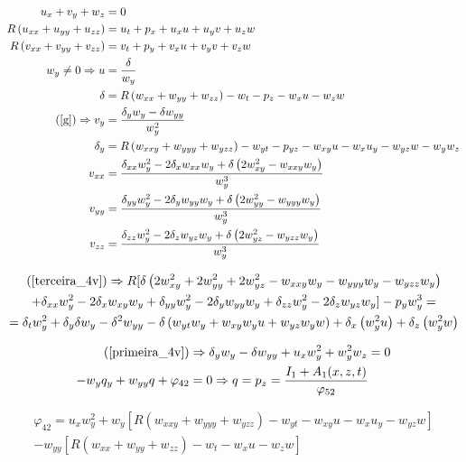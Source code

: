 \documentclass[12pt,a4paper]{article}
\begin{document}
	\begin{align}
	  u_x + v_y + w_z &= 0 \label{primeira_4v} \\
	  R \left(u_{xx} + u_{yy} + u_{zz} \right) &= u_t + p_x + u_x u + u_y v + u_z w \label{segunda_4v} \\
	  R \left(v_{xx} + v_{yy} + v_{zz} \right) &= v_t + p_y + v_x u + v_y v + v_z w \label{terceira_4v} \\
	  w_y \neq 0 \Rightarrow u &= \frac{\delta}{w_y} \\
	  \delta &= R \left(w_{xx} + w_{yy} + w_{zz} \right) - w_t - p_z - w_x u - w_z w \\
	  (\ref{g}) \Rightarrow v_y &= \frac{\delta_y w_y - \delta w_{yy}}{w_y^2} \\
	  \delta_y &= R \left(w_{xxy} + w_{yyy} + w_{yzz} \right) - w_{yt} - p_{yz} - w_{xy} u - w_x u_y - w_{yz} w - w_y w_z \\
	  v_{xx} &= \frac{\delta_{xx} w_y^2 - 2\delta_x w_{xx} w_y + \delta \left( 2w_{xy}^2 - w_{xxy} w_y \right)}{w_y^3} \\
	  v_{yy} &= \frac{\delta_{yy} w_y^2 - 2\delta_y w_{yy} w_y + \delta \left( 2w_{yy}^2 - w_{yyy} w_y \right)}{w_y^3} \\
	  v_{zz} &= \frac{\delta_{zz} w_y^2 - 2\delta_z w_{yz} w_y + \delta \left( 2w_{yz}^2 - w_{yzz} w_y \right)}{w_y^3}
	\end{align}

	\begin{multline}
    (\ref{terceira_4v}) \Rightarrow R [\delta \left( 2 w_{xy}^2 + 2 w_{yy}^2 + 2 w_{yz}^2 - w_{xxy}w_y - w_{yyy} w_y - w_{yzz} w_y \right) \\
    + \delta_{xx} w_y^2 - 2\delta_x w_{xy} w_y + \delta_{yy} w_y^2 - 2\delta_y w_{yy} w_y + \delta_{zz} w_y^2 - 2\delta_z w_{yz} w_y ] - p_y w_y^3 = \\
    = \delta_t w_y^2 + \delta_y \delta w_y - \delta^2 w_{yy} - \delta \left(w_{yt} w_y + w_{xy} w_y u + w_{yz} w_y w \right) + \delta_x \left(w_y^2 u \right) + \delta_z \left(w_y^2 w \right)
	\end{multline}

	\begin{align}
    (\ref{primeira_4v}) &\Rightarrow \delta_y w_y - \delta w_{yy} + u_x w_y^2 + w_y^2 w_z = 0 \\
    -w_y q_y + w_{yy} q + \varphi_{42} &= 0 \Rightarrow q = p_z = \frac{I_1 + A_1(x,z,t)}{\varphi_{52}}
	\end{align}

	\begin{multline}
    \varphi_{42} = u_x w_y^2 + w_y [ R \left(w_{xxy} + w_{yyy} + w_{yzz} \right) - w_{yt} - w_{xy} u - w_x u_y - w_{yz} w] \\
    - w_{yy} [ R \left(w_{xx} + w_{yy} + w_{zz} \right) - w_t - w_x u - w_z w ]
	\end{multline}
\end{document}
